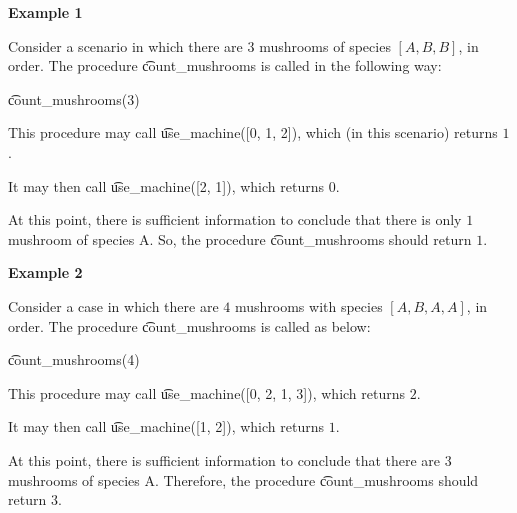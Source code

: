 \textbf{Example 1}

Consider a scenario in which there are $3$ mushrooms of species $[A, B, B]$, in order. The procedure \t{count\_mushrooms} is called in the following way:

\t{count\_mushrooms(3)}

This procedure may call \t{use\_machine([0, 1, 2])}, which (in this scenario) returns $1$.

It may then call  \t{use\_machine([2, 1])}, which returns $0$.

At this point, there is sufficient information to conclude that there is only $1$ mushroom of species A. So, the procedure \t{count\_mushrooms} should return $1$.

\textbf{Example 2}

Consider a case in which there are $4$ mushrooms with species $[A, B, A, A]$, in order. The procedure \t{count\_mushrooms} is called as below:

\t{count\_mushrooms(4)}

This procedure may call \t{use\_machine([0, 2, 1, 3])}, which returns $2$.

It may then call \t{use\_machine([1, 2])}, which returns $1$.

At this point, there is sufficient information to conclude that there are $3$ mushrooms of species A. Therefore, the procedure \t{count\_mushrooms} should return $3$.